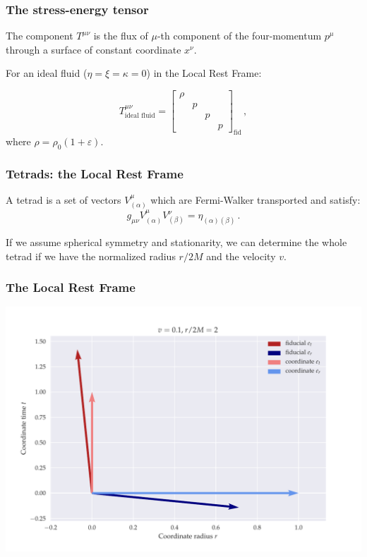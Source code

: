 \documentclass{beamer}
\begin{document}
\begin{frame}
    \frametitle{The stress-energy tensor}

    The component \(T^{\mu\nu}\) is the flux of \(\mu\)-th component of the four-momentum \(p^\mu\) through a surface of constant coordinate \(x^\nu\).

    For an ideal fluid (\(\eta = \xi = \kappa = 0\)) in the Local Rest Frame:

    \begin{equation*}
        T^{\mu\nu}_{\text{ideal fluid}} =
        \begin{bmatrix}
        \rho   &   &   &  \\
           & p  &   &  \\
           &   & p  &  \\
           &   &   & p
       \end{bmatrix}_{\text{fid}} \,,
    \end{equation*}
    where \(\rho = \rho_0 (1 + \varepsilon)\).
\end{frame}

\begin{frame}
    \frametitle{Tetrads: the Local Rest Frame}

    A tetrad is a set of vectors \(V^\mu _{(\alpha)}\) which are Fermi-Walker transported and satisfy:
    \begin{equation*}
        g_{\mu\nu} V^\mu _{(\alpha)} V^\nu _{(\beta)} = \eta_{(\alpha) (\beta)}\,.
    \end{equation*}

    If we assume spherical symmetry and stationarity, we can determine the whole tetrad if we have the normalized radius \(r/2M\) and the velocity \(v\).
\end{frame}

\begin{frame}
    \frametitle{The Local Rest Frame}
        \includegraphics[width=\textwidth]{figures/low_speed}
\end{frame}
\end{document}
